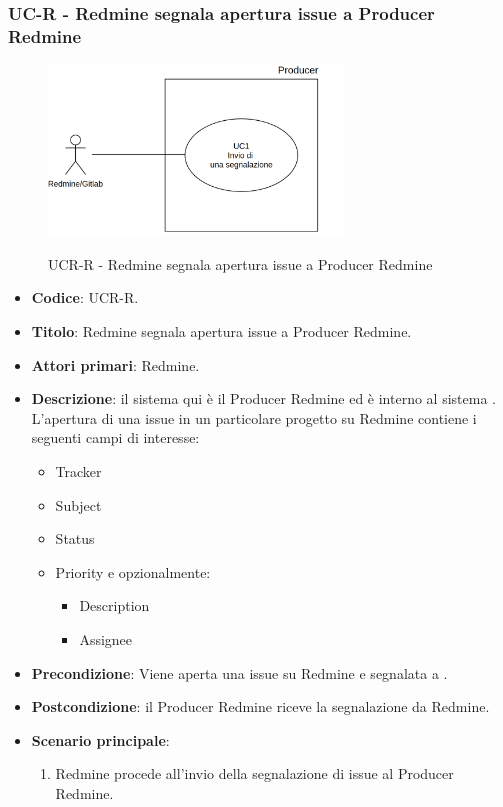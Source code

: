\subsubsection{UC\theuccount-R - Redmine segnala apertura issue a Producer Redmine}
    \begin{figure}[H]
		\centering
		\includegraphics[width=0.7\textwidth]{img/UC1.png}\\
		\caption{UCR\theuccount-R - Redmine segnala apertura issue a Producer
			Redmine}
	\end{figure}
	\begin{itemize}
		\item \textbf{Codice}: UCR\theuccount-R.
		\item \textbf{Titolo}: Redmine segnala apertura issue a Producer Redmine.
		\item \textbf{Attori primari}: Redmine.
		\item \textbf{Descrizione}: il sistema qui è il Producer Redmine ed è interno al sistema \progetto.
		 L'apertura di una issue in un particolare progetto su Redmine
		 contiene i seguenti campi di interesse:
		 \begin{itemize}
		 	\item Tracker
		 	\item Subject
		 	\item Status
		 	\item Priority e opzionalmente:
		 	\begin{itemize}
		 		\item Description
		 		\item Assignee
		 	\end{itemize}
		 \end{itemize}
		\item \textbf{Precondizione}: Viene aperta una issue su Redmine e
		segnalata a \progetto.
		\item \textbf{Postcondizione}: il Producer Redmine riceve la segnalazione da Redmine.
		\item \textbf{Scenario principale}: 
		\begin{enumerate}
			\item Redmine procede all'invio della segnalazione di issue al Producer Redmine.
		\end{enumerate}
		
	\end{itemize}
